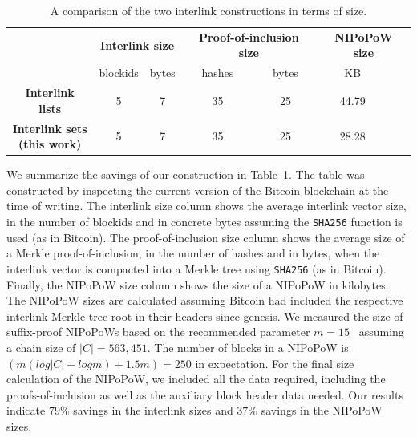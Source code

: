 
\begin{table}[h!]
  \begin{center}
    \begin{tabular}{|c|cc|cc|cc|}
      \hline
      & \multicolumn{2}{c|}{\bf Interlink size}
      & \multicolumn{2}{c|}{\bf Proof-of-inclusion size}
      & \multicolumn{2}{c|}{\bf NIPoPoW size}\\
      & blockids & bytes & hashes & bytes & KB\\
      \hhline{-------}
      \textbf{Interlink lists}&
      5 & 7 & 35 & 25 & 44.79\\
      \hline
      \makecell{\bf Interlink sets\\(this work)}&
      5 & 7 & 35 & 25 & 28.28\\
      \hline
    \end{tabular}
    \vspace{10pt}
    \caption{A comparison of the two interlink constructions in terms of size.}
    \label{tab.savings}
  \end{center}
\end{table}

We summarize the savings of our construction in Table~\ref{tab.savings}. The
table was constructed by inspecting the current version of the Bitcoin
blockchain at the time of writing. The interlink size column shows the average
interlink vector size, in the number of blockids and in concrete bytes assuming
the \texttt{SHA256} function is used (as in Bitcoin). The proof-of-inclusion
size column shows the average size of a Merkle proof-of-inclusion, in the number
of hashes and in bytes, when the interlink vector is compacted into a Merkle
tree using \texttt{SHA256} (as in Bitcoin). Finally, the NIPoPoW size column
shows the size of a NIPoPoW in kilobytes. The NIPoPoW sizes are calculated
assuming Bitcoin had included the respective interlink Merkle tree root in their
headers since genesis. We measured the size of suffix-proof NIPoPoWs based on
the recommended parameter $m = 15$~\cite{nipopows} assuming a chain size of $|C|
= 563{,}451$. The number of blocks in a NIPoPoW is $(m(log |C| - log m) + 1.5m)
= 250$ in expectation. For the final size calculation of the NIPoPoW, we
included all the data required, including the proofs-of-inclusion as well as the
auxiliary block header data needed. Our results indicate $79\%$ savings in the
interlink sizes and $37\%$ savings in the NIPoPoW sizes.
